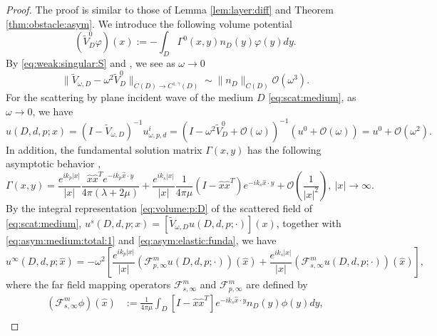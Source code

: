 \documentclass[a4paper,11pt]{article}
\theoremstyle{remark}
\theoremstyle{definition}
\numberwithin{equation}{section}
\begin{document}
\begin{proof}
The proof is similar to those of Lemma \ref{lem:layer:diff} and Theorem \ref{thm:obstacle:asym}. We introduce the following volume potential
\[
 (\tilde{V}_{D}^{0}\varphi)(x)  :=   - \int_{D}\Gamma^{0}(x,y)n_{D}(y)\varphi(y)dy.
\]
By \eqref{eq:weak:singular:S} and \cite[Chap. 5]{PHhab}, we see as $\omega \rightarrow 0$
\begin{equation}
 \|\tilde{V}_{\omega,D}-\omega^2\tilde{V}_{D}^0\|_{C(D)\rightarrow C^{1, \gamma}(D)} \sim \|n_{D}\|_{C(D)}\mathcal{O}(\omega^3).
\end{equation}
For the scattering by plane incident wave of the medium $D$ \eqref{eq:scat:medium}, as $\omega \rightarrow 0$, we have
 \begin{equation}\label{eq:asym:medium:total:1}
 u(D,d, p;x) = (I- \tilde{V}_{\omega,D})^{-1}u_{\omega, p,d}^{i} =  (I - \omega^2 \tilde{V}_{D}^{0} +\mathcal{O}(\omega) )^{-1}(u^0 + \mathcal{O}(\omega)) = u^0 + \mathcal{O}(\omega^2).
 \end{equation}
In addition, the fundamental solution matrix $\Gamma(x,y)$ has the following asymptotic behavior \cite{Kup},
 \begin{equation}\label{eq:asym:elastic:funda}
 \Gamma(x,y) = \frac{e^{ik_p|x|}}{|x|}\frac{\hat{x}\hat{x}^{T}e^{-ik_p \hat{x}\cdot y}}{4\pi(\lambda+2\mu)}
 + \frac{e^{ik_s|x|}}{|x|}\frac{1}{4\pi \mu}(I-\hat{x}\hat{x}^{T})e^{-ik_s\hat{x}\cdot y} + \mathcal{O}(\frac{1}{|x|^2}), \ |x| \rightarrow \infty.
 \end{equation}
By the integral representation \eqref{eq:volume:p:D} of the scattered field of \eqref{eq:scat:medium}, $ u^s(D,d, p;x) = [\tilde{V}_{\omega,D}u(D,d,p;\cdot)](x)$, together with \eqref{eq:asym:medium:total:1} and \eqref{eq:asym:elastic:funda},
we have
\begin{equation*}
 u^{\infty}(D,d, p;\hat{x}) = -\omega^2 \left[ \frac{e^{ik_p|x|}}{|x|} (\mathcal{F}^{m}_{p,\infty} u(D,d, p;\cdot))(\hat{x}) +   \frac{e^{ik_s|x|}}{|x|}(\mathcal{F}^{m}_{s,\infty} u(D,d, p;\cdot))(\hat{x}) \right],
\end{equation*}
where the far field mapping operators $\mathcal{F}^{m}_{s,\infty}$ and $\mathcal{F}^{m}_{p,\infty}$ are defined by
\begin{align}
(\mathcal{F}^{m}_{s,\infty}\phi)(\hat{x})&:= \frac{1}{4\pi \mu}\int_{D} [I -\hat{x}\hat{x}^{T}]e^{-ik_s\hat{x}\cdot y} n_{D}(y) \phi(y) dy,\label{eq:far:s:asy:medium}\\

\end{align}
\end{proof}
\end{document}

